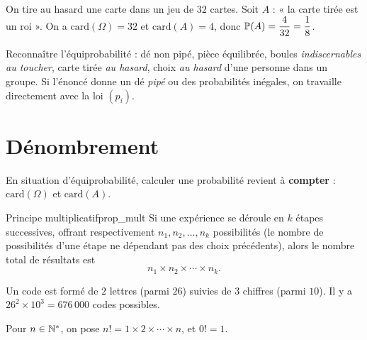 \begin{exemple}
	On tire au hasard une carte dans un jeu de $32$ cartes. Soit $A$ : « la
	carte tirée est un roi ». On a $\mathrm{card}(\Omega)=32$ et
	$\mathrm{card}(A)=4$, donc $\mathbb{P}(A) = \dfrac{4}{32} = \dfrac{1}{8}$.
\end{exemple}

\begin{astucebac}
	Reconnaître l'équiprobabilité : dé non pipé, pièce équilibrée, boules
	\emph{indiscernables au toucher}, carte tirée \emph{au hasard}, choix
	\emph{au hasard} d'une personne dans un groupe. Si l'énoncé donne un dé
	\emph{pipé} ou des probabilités inégales, on travaille directement avec la
	loi $(p_i)$.
\end{astucebac}


\section{Dénombrement}

En situation d'équiprobabilité, calculer une probabilité revient à
\textbf{compter} : $\mathrm{card}(\Omega)$ et $\mathrm{card}(A)$.

\begin{propriete}{Principe multiplicatif}{prop_mult}
	Si une expérience se déroule en $k$ étapes successives, offrant
	respectivement $n_1, n_2, \ldots, n_k$ possibilités (le nombre de
	possibilités d'une étape ne dépendant pas des choix précédents), alors le
	nombre total de résultats est
	\[
	n_1\times n_2\times\cdots\times n_k.
	\]
\end{propriete}

\begin{exemple}
	Un code est formé de $2$ lettres (parmi $26$) suivies de $3$ chiffres
	(parmi $10$). Il y a $26^2\times 10^3 = 676\,000$ codes possibles.
\end{exemple}

\begin{definition}[Factorielle]
	Pour $n\in\mathbb{N}^*$, on pose $n! = 1\times 2\times\cdots\times n$, et $0!=1$.
\end{definition}

